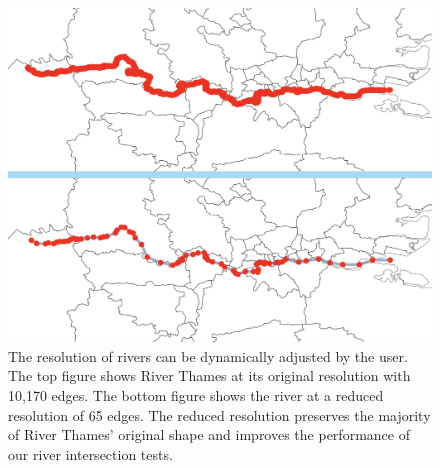 {
\begin{figure}[tb!]
    \centering
    \includegraphics[width=\columnwidth]{figure/river_resolution.png}
    \caption{The resolution of rivers can be dynamically adjusted by the user. The top figure shows River Thames at its original resolution with 10,170 edges. The bottom figure shows the river at a  reduced resolution of 65 edges. The reduced resolution preserves the majority of River Thames' original shape and improves the performance of our river intersection tests.}
    \label{fig:river resolution}
\end{figure}
}

